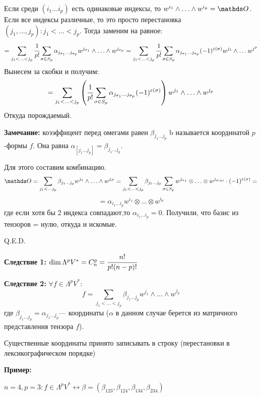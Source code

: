 Если среди $(i_1\ldots i_p)$ есть одинаковые индексы, то $w^{i_1} \wedge \ldots \wedge w^{i_p} = \zero$. Если все индексы различные, то это просто перестановка $(j_1,\ldots,j_p): j_1<\ldots <j_p$. Тогда заменим на равное:
$$=\sum_{j_1<\ldots<j_p}\cfrac{1}{p!}\sum\limits_{\sigma \in S_p} \alpha_{j_{\sigma_1}\ldots j_{\sigma_p}} w^{j_{\sigma_1}}\wedge \ldots \wedge w^{j_{\sigma_p}} = \sum_{j_1<\ldots<j_p}\cfrac{1}{p!}\sum\limits_{\sigma \in S_p} \alpha_{j_{\sigma_1}\ldots j_{\sigma_p}} (-1)^{\varepsilon(\sigma)}w^{j_1}\wedge \ldots w^{j^p}$$
Вынесем за скобки и получим:
$$=\sum_{j_1<\ldots<j_p}\left(\cfrac{1}{p!}\sum\limits_{\sigma \in S_p}\alpha_{j_{\sigma_1}\ldots j_{\sigma_p}}(-1)^{\varepsilon(\sigma)}\right)w^{j_1}\wedge \ldots \wedge w^{j_p}$$
Откуда порождаемый.

\textbf{Замечание:} коээффицент перед омегами равен $\beta_{j_1\ldots j_p}$ b называется  координатой $p$-формы $f$.  Она равна $\alpha_{[j_1\ldots j_p]}=\beta_{j_1\ldots j_p}$. 


Для этого составим комбинацию. 
$$\zero=\sum\limits_{j_1 <\ldots j_p}\beta_{j_1\ldots j_p} w^{j_1}\wedge \ldots \wedge w^{j_P}= 
\sum\limits_{j_1 < \ldots <j_p} \beta_{j_1\ldots j_p}\sum_{\sigma \in S_p} w^{j_{\sigma_1}}\otimes\ldots\otimes w^{j_{\sigma(p)}} \cdot (-1)^{\varepsilon(\sigma)} = $$
$$= \alpha_{i_1\ldots i_p} w^{i_1}\otimes \ldots \otimes w^{i_p}$$
где если хотя бы 2 индекса совпадают,то $\alpha_{i_1\ldots i_p} = 0$. Получили, что базис из тензоров = нулю, откуда и искомые.

\hfill Q.E.D.

\textbf{Следствие 1:} $\dim \Lambda^pV^* = C^p_n = \cfrac{n!}{p!(n-p)!}$

\textbf{Следствие 2:} $\forall f \in \Lambda^p V^*:$
$$f = \sum\limits_{j_1<\ldots <j_p} \beta_{j_1\ldots j_p}w^{j_1}\wedge \ldots \wedge w^{j_p}$$
где $\beta_{j_1\ldots j_p} = \alpha_{j_1\ldots j_p}$--- 
 координаты ($\alpha$ в данном случае берется из матричного представления тензора $f$).



Существенные координаты принято записывать в строку
(перестановки в лексикографическом порядке)

\textbf{Пример:}

$n=4, p=3: f\in \Lambda^{p}V^* \leftrightarrow \beta = (\beta_{123},\beta_{124},\beta_{134}, \beta_{234})$


